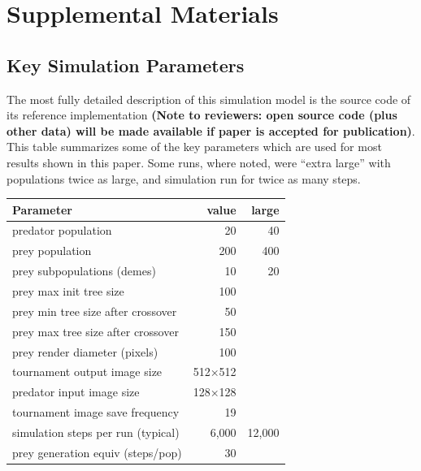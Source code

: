 \documentclass[acmtog,
    anonymous,
    review
    ]{acmart}
\begin{document}

\appendix
\onecolumn
\section{Supplemental Materials}
\subsection{Key Simulation Parameters}
\setcounter{page}{0}

\begin{minipage}{\linewidth}
The most fully detailed description of this simulation model is the source code of its reference implementation \textbf{(Note to reviewers: open source code (plus other data) will be made available if paper is accepted for publication)}. This table summarizes some of the key parameters which are used for most results shown in this paper. Some runs, where noted, were “extra large” with populations twice as large, and simulation run for twice as many steps.
\par
\hspace*{1cm}
\begin{minipage}{\linewidth-1.1cm}
\begin{table}[H]
\raggedright 
\begin{tabular}{ |l|r|r| }
\hline
\textbf{Parameter} & \textbf{value} & \textbf{large} \\ 
\hline
predator population & 20 & 40 \\ 
prey population & 200 & 400 \\ 
prey subpopulations (demes) & 10 & 20 \\
prey max init tree size & 100 & \\
prey min tree size after crossover & 50 & \\
prey max tree size after crossover & 150 & \\
\hline
prey render diameter (pixels) & 100 & \\ 
tournament output image size & 512×512 & \\ 
predator input image size & 128×128 & \\ 
\hline
tournament image save frequency & 19 & \\
simulation steps per run (typical) & 6,000 & 12,000 \\
prey generation equiv (steps/pop) & 30 & \\

\end{tabular}
\end{table}
\end{minipage}
\end{minipage}
\end{document}
